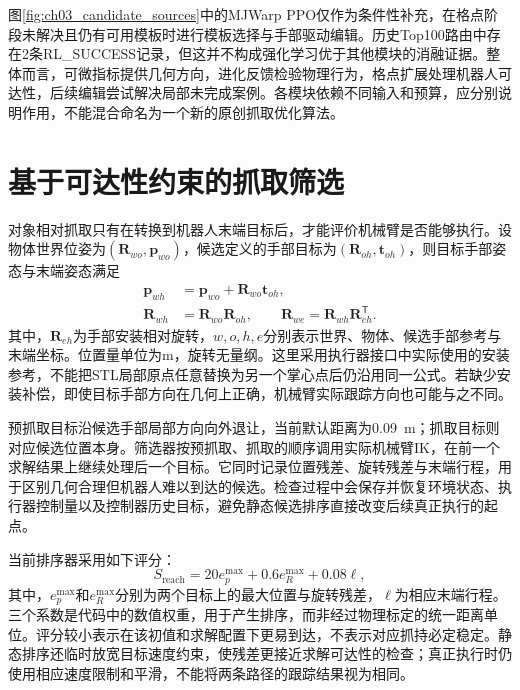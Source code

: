 图\ref{fig:ch03_candidate_sources}中的MJWarp PPO仅作为条件性补充，在格点阶段未解决且仍有可用模板时进行模板选择与手部驱动编辑。历史Top100路由中存在2条RL\_SUCCESS记录，但这并不构成强化学习优于其他模块的消融证据。整体而言，可微指标提供几何方向，进化反馈检验物理行为，格点扩展处理机器人可达性，后续编辑尝试解决局部未完成案例。各模块依赖不同输入和预算，应分别说明作用，不能混合命名为一个新的原创抓取优化算法。

\section{基于可达性约束的抓取筛选}
\label{sec:grasp_reachability}

对象相对抓取只有在转换到机器人末端目标后，才能评价机械臂是否能够执行。设物体世界位姿为$(\boldsymbol R_{wo},\boldsymbol p_{wo})$，候选定义的手部目标为$(\boldsymbol R_{oh},\boldsymbol t_{oh})$，则目标手部姿态与末端姿态满足
\begin{equation}
 \begin{aligned}
 \boldsymbol p_{wh}&=\boldsymbol p_{wo}+\boldsymbol R_{wo}\boldsymbol t_{oh},\\
 \boldsymbol R_{wh}&=\boldsymbol R_{wo}\boldsymbol R_{oh},\qquad
 \boldsymbol R_{we}=\boldsymbol R_{wh}\boldsymbol R_{eh}^{\mathsf T}.
 \end{aligned}
 \label{eq:ch03_target_transform}
\end{equation}
其中，$\boldsymbol R_{eh}$为手部安装相对旋转，$w,o,h,e$分别表示世界、物体、候选手部参考与末端坐标。位置量单位为m，旋转无量纲。这里采用执行器接口中实际使用的安装参考，不能把STL局部原点任意替换为另一个掌心点后仍沿用同一公式。若缺少安装补偿，即使目标手部方向在几何上正确，机械臂实际跟踪方向也可能与之不同。

预抓取目标沿候选手部局部方向向外退让，当前默认距离为0.09~m；抓取目标则对应候选位置本身。筛选器按预抓取、抓取的顺序调用实际机械臂IK，在前一个求解结果上继续处理后一个目标。它同时记录位置残差、旋转残差与末端行程，用于区别几何合理但机器人难以到达的候选。检查过程中会保存并恢复环境状态、执行器控制量以及控制器历史目标，避免静态候选排序直接改变后续真正执行的起点。

当前排序器采用如下评分：
\begin{equation}
 S_{\mathrm{reach}}=20e_p^{\max}+0.6e_R^{\max}+0.08\ell,
 \label{eq:ch03_reachability_score}
\end{equation}
其中，$e_p^{\max}$和$e_R^{\max}$分别为两个目标上的最大位置与旋转残差，$\ell$为相应末端行程。三个系数是代码中的数值权重，用于产生排序，而非经过物理标定的统一距离单位。评分较小表示在该初值和求解配置下更易到达，不表示对应抓持必定稳定。静态排序还临时放宽目标速度约束，使残差更接近求解可达性的检查；真正执行时仍使用相应速度限制和平滑，不能将两条路径的跟踪结果视为相同。

